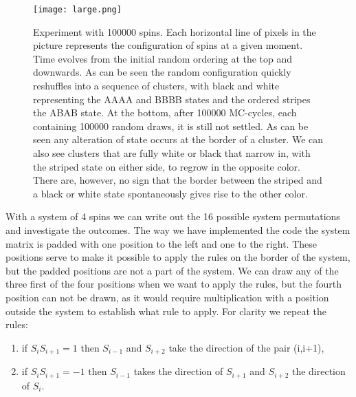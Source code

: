 \documentclass[a4paper]{article}
\begin{document}
\begin{figure}[H]
 \centerline{\texttt{[image: large.png]}}
 \caption{Experiment with 100000 spins. Each horizontal line of pixels in the picture represents the configuration of spins at a given moment. Time evolves from the initial random ordering at the top and downwards. As can be seen the random configuration quickly reshuffles into a sequence of clusters, with black and white representing the AAAA and BBBB states and the ordered stripes the ABAB state. At the bottom, after 100000 MC-cycles, each containing 100000 random draws, it is still not settled. As can be seen any alteration of state occurs at the border of a cluster. We can also see clusters that are fully white or black that narrow in, with the striped state on either side, to regrow in the opposite color. There are, however, no sign that the border between the striped and a black or white state spontaneously gives rise to the other color. }
 \label{fig:large}
\end{figure}



With a system of 4 spins we can write out the 16 possible system permutations and investigate the outcomes. The way we have implemented the code the system matrix is padded with one position to the left and one to the right. These positions serve to make it possible to apply the rules on the border of the system, but the padded positions are not a part of the system.  We can draw any of the three first of the four positions when we want to apply the rules, but the fourth position can not be drawn, as it would require multiplication with a position outside the system to establish what rule to apply. For clarity we repeat the rules:

\begin{enumerate}
\item if $S_iS_{i+1}=1$ then $S_{i-1}$ and $S_{i+2}$ take the direction of the pair (i,i+1),

\item if $S_iS_{i+1}=-1$ then $S_{i-1}$ takes the direction of $S_{i+1}$ and $S_{i+2}$ the direction of $S_i$. 
\end{enumerate}



\end{document}
